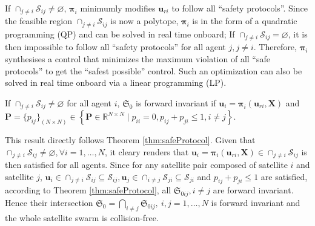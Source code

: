 \documentclass{ifacconf}
\begin{document}
\par If $\cap_{j\neq i} \mathcal{S}_{ij} \neq \varnothing$, $\boldsymbol{\pi}_i$ minimumly modifies $\boldsymbol{u}_{ri}$ to follow all ``safety protocols''.
Since the feasible region $\cap_{j\neq i} \mathcal{S}_{ij}$ is now a polytope, $\boldsymbol{\pi}_i$ is in the form of a quadratic programming (QP) and can be solved in real time onboard; 
If $\cap_{j\neq i} \mathcal{S}_{ij} = \varnothing$, it is then impossible to follow all ``safety protocols'' for all agent $j, j\neq i$. Therefore, $\boldsymbol{\pi}_i$ synthesises a control that minimizes the maximum violation of all ``safe protocols'' to get the ``safest possible'' control.
Such an optimization can also be solved in real time onboard via a linear programming (LP).

\begin{thm}
   If $\cap_{j\neq i} \mathcal{S}_{ij} \neq \varnothing$ for all agent $i$, $\mathfrak{S}_0$ is forward invariant if $\boldsymbol{u}_i = \boldsymbol{\pi}_i(\boldsymbol{u}_{ri}, \boldsymbol{X})$ and $\boldsymbol{P} = \{p_{ij}\}_{(N\times N)} \in \left\{ \boldsymbol{P} \in \mathbb{R}^{N\times N} \mid p_{ii} = 0,  p_{ij} + p_{ji} \le 1, i\neq j \right\}$.
\end{thm}
\begin{pf}
   This result directly follows Theorem \ref{thm:safeProtocol}. 
   Given that $\cap_{j\neq i} \mathcal{S}_{ij} \neq \varnothing, \forall i = 1, 
   \dots, N$, it cleary renders that $\boldsymbol{u}_i = \boldsymbol{\pi}_i(\boldsymbol{u}_{ri}, \boldsymbol{X}) \in \cap_{j\neq i} \mathcal{S}_{ij}$ is then satisfied for all agents.
   Since for any satellite pair composed of satellite $i$ and satellite $j$, $\boldsymbol{u}_i \in \cap_{j\neq i} \mathcal{S}_{ij} \subseteq  \mathcal{S}_{ij}, \boldsymbol{u}_j \in \cap_{i\neq j} \mathcal{S}_{ji} \subseteq  \mathcal{S}_{ji}$ and $p_{ij} + p_{ji} \le 1$ are satisfied, according to Theorem \ref{thm:safeProtocol}, all $\mathfrak{S}_{0ij}, i \neq j$ are forward invariant.
   Hence their intersection $\mathfrak{S}_0 = \bigcap_{i \neq j}\mathfrak{S}_{0ij}, ~i,j = 1, \dots, N$ is forward invariant and the whole satellite swarm is collision-free.
\end{pf}
\end{document}
